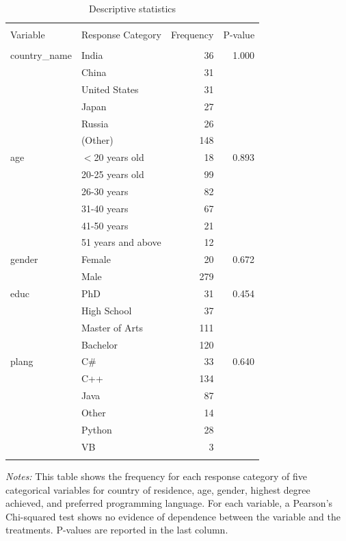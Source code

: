 \documentclass[12pt,]{article}
\newenvironment{tablenotes}[1][]{
  \begin{minipage}{\textwidth}\emph{Notes:}{\footnotesize #1}
}{\end{minipage}}
\begin{document}
\begin{table}
\centering
\caption{Descriptive statistics}
\label{tab: desc}
\begin{tabular}{lp{4cm}rr}
  \\[-1.8ex]\hline \hline \\[-1.8ex]
Variable & Response Category & Frequency & P-value \\ 
  \hline \\[-1.86ex]
country\_name & India & 36 & 1.000 \\ 
   & China & 31 &  \\ 
   & United States & 31 &  \\ 
   & Japan & 27 &  \\ 
   & Russia & 26 &  \\ 
   & (Other) & 148 &  \\ 
  age & $<$20 years old & 18 & 0.893 \\ 
   & 20-25 years old & 99 &  \\ 
   & 26-30 years & 82 &  \\ 
   & 31-40 years & 67 &  \\ 
   & 41-50 years & 21 &  \\ 
   & 51 years and above & 12 &  \\ 
  gender & Female & 20 & 0.672 \\ 
   & Male & 279 &  \\ 
  educ & PhD & 31 & 0.454 \\ 
   & High School & 37 &  \\ 
   & Master of Arts & 111 &  \\ 
   & Bachelor & 120 &  \\ 
  plang & C\# & 33 & 0.640 \\ 
   & C++ & 134 &  \\ 
   & Java & 87 &  \\ 
   & Other & 14 &  \\ 
   & Python & 28 &  \\ 
   & VB & 3 &  \\ 
   \hline \\[-1.8ex]
\end{tabular}
\begin{tablenotes}\footnotesize
This table shows the frequency for each response category of five categorical variables for country of residence, age, gender, highest degree achieved, and preferred programming language. For each variable, a Pearson's Chi-squared test shows no evidence of dependence  between the variable and the treatments. P-values are reported in the last column.
\end{tablenotes}
\end{table}
\end{document}
